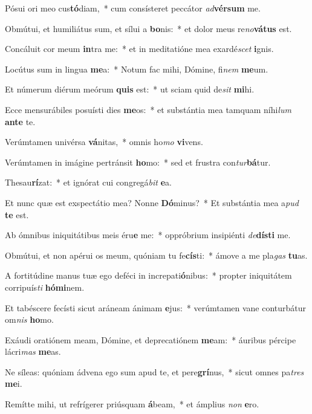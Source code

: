 \item Pósui ori meo cus\textbf{tó}diam,~* cum consísteret peccátor \textit{ad}\textbf{vér}\textbf{sum} me.
\item Obmútui, et humiliátus sum, et sílui a \textbf{bo}nis:~* et dolor meus re\textit{no}\textbf{vá}\textbf{tus} est.
\item Concáluit cor meum \textbf{in}tra me:~* et in meditatióne mea exardé\textit{scet} \textbf{i}gnis.
\item Locútus sum in lingua \textbf{me}a:~* Notum fac mihi, Dómine, fi\textit{nem} \textbf{me}um.
\item Et númerum diérum meórum \textbf{quis} est:~* ut sciam quid de\textit{sit} \textbf{mi}hi.
\item Ecce mensurábiles posuísti dies \textbf{me}os:~* et substántia mea tamquam níhi\textit{lum} \textbf{an}\textbf{te} te.
\item Verúmtamen univérsa \textbf{vá}nitas,~* omnis ho\textit{mo} \textbf{vi}vens.
\item Verúmtamen in imágine pertránsit \textbf{ho}mo:~* sed et frustra con\textit{tur}\textbf{bá}tur.
\item Thesau\textbf{rí}zat:~* et ignórat cui congregá\textit{bit} \textbf{e}a.
\item Et nunc quæ est exspectátio mea? Nonne \textbf{Dó}minus?~* Et substántia mea a\textit{pud} \textbf{te} est.
\item Ab ómnibus iniquitátibus meis éru\textbf{e} me:~* oppróbrium insipiénti \textit{de}\textbf{dís}\textbf{ti} me.
\item Obmútui, et non apérui os meum, quóniam tu fe\textbf{cís}ti:~* ámove a me pla\textit{gas} \textbf{tu}as.
\item A fortitúdine manus tuæ ego deféci in increpati\textbf{ó}nibus:~* propter iniquitátem corripuís\textit{ti} \textbf{hó}\textbf{mi}nem.
\item Et tabéscere fecísti sicut aráneam ánimam \textbf{e}jus:~* verúmtamen vane conturbátur om\textit{nis} \textbf{ho}mo.
\item Exáudi oratiónem meam, Dómine, et deprecatiónem \textbf{me}am:~* áuribus pércipe lácri\textit{mas} \textbf{me}as.
\item Ne síleas: quóniam ádvena ego sum apud te, et pere\textbf{grí}nus,~* sicut omnes pa\textit{tres} \textbf{me}i.
\item Remítte mihi, ut refrígerer priúsquam \textbf{á}beam,~* et ámplius \textit{non} \textbf{e}ro.
